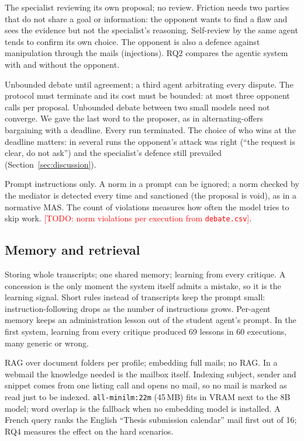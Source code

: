 \documentclass[11pt,a4paper]{article}
\newcommand{\code}[1]{\texttt{#1}}
\newcommand{\todo}[1]{\textcolor{red}{[TODO: #1]}}
\begin{document}
{The specialist reviewing its own proposal; no review.}
{Friction needs two parties that do not share a goal or information: the opponent wants to find a flaw and sees the
evidence but not the specialist's reasoning. Self-review by the same agent tends to confirm its own choice. The
opponent is also a defence against manipulation through the mails (injections).}
{RQ2 compares the agentic system with and without the opponent.}

{Unbounded debate until agreement; a third agent arbitrating every dispute.}
{The protocol must terminate and its cost must be bounded: at most three opponent calls per proposal. Unbounded
debate between two small models need not converge. We gave the last word to the proposer, as in alternating-offers
bargaining with a deadline.}
{Every run terminated. The choice of who wins at the deadline matters: in several runs the opponent's attack was
right (``the request is clear, do not ask'') and the specialist's defence still prevailed (Section~\ref{sec:discussion}).}

{Prompt instructions only.}
{A norm in a prompt can be ignored; a norm checked by the mediator is detected every time and sanctioned (the
proposal is void), as in a normative MAS. The count of violations measures how often the model tries to skip work.}
{\todo{norm violations per execution from \code{debate.csv}}.}

\subsection{Memory and retrieval}
{Storing whole transcripts; one shared memory; learning from every critique.}
{A concession is the only moment the system itself admits a mistake, so it is the learning signal. Short rules
instead of transcripts keep the prompt small: instruction-following drops as the number of instructions grows.
Per-agent memory keeps an administration lesson out of the student agent's prompt.}
{In the first system, learning from every critique produced 69 lessons in 60 executions, many generic or wrong.}

{RAG over document folders per profile; embedding full mails; no RAG.}
{In a webmail the knowledge needed is the mailbox itself. Indexing subject, sender and snippet comes from one listing
call and opens no mail, so no mail is marked as read just to be indexed. \code{all-minilm:22m} (45\,MB) fits in
VRAM next to the 8B model; word overlap is the fallback when no embedding model is installed.}
{A French query ranks the English ``Thesis submission calendar'' mail first out of 16; RQ4 measures the effect on
the hard scenarios.}
\end{document}
